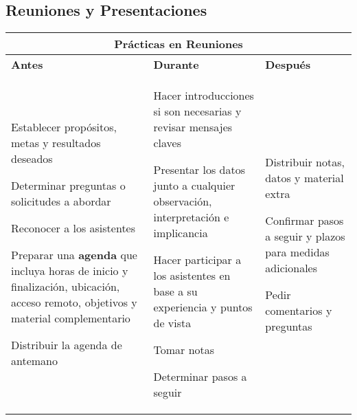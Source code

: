 \subsection{Reuniones y Presentaciones}
\begin{table}
    \centering
    \begin{tabular}{|p{4.8cm}|p{4.8cm}|p{4.7cm}}
        \hline
        \multicolumn{3}{|c|}{Prácticas en Reuniones} \\
        \hline
        \textbf{Antes} & \textbf{Durante}  &\textbf{Después} \\
        \hline
        \begin{description}
            \item {Establecer propósitos, metas y resultados deseados}
            \item {Determinar preguntas o solicitudes a abordar}
            \item {Reconocer a los asistentes}
            \item {Preparar una \textbf{agenda} que incluya horas de inicio y finalización, ubicación, acceso remoto, objetivos y material complementario}
            \item {Distribuir la agenda de antemano}
        \end{description} & \begin{description}
            \item {Hacer introducciones si son necesarias y revisar mensajes claves}
            \item {Presentar los datos junto a cualquier observación, interpretación e implicancia}
            \item {Hacer participar a los asistentes en base a su experiencia y puntos de vista}
            \item {Tomar notas}
            \item {Determinar pasos a seguir}
        \end{description} &  \begin{description}
            \item {Distribuir notas, datos y material extra}
            \item {Confirmar pasos a seguir y plazos para medidas adicionales}
            \item {Pedir comentarios y preguntas}
        \end{description} \\
        \hline
    \end{tabular}
\end{table}

